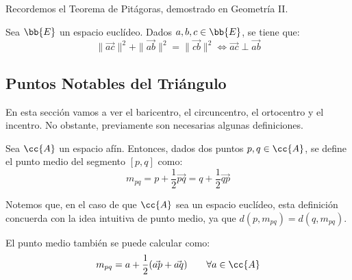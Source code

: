 Recordemos el Teorema de Pitágoras, demostrado en Geometría II.
\begin{teo}[de Pitágoras]
    Sea $\bb{E}$ un espacio euclídeo. Dados $a,b,c\in \bb{E}$, se tiene que:
    \begin{equation*}
        \|\vec{ac}\|^2 + \|\vec{ab}\|^2 = \|\vec{cb}\|^2 \Longleftrightarrow \vec{ac}\perp \vec{ab}
    \end{equation*}
    \begin{figure}[H]
        \centering
    \end{figure}
\end{teo}


\subsection{Puntos Notables del Triángulo}

En esta sección vamos a ver el baricentro, el circuncentro, el ortocentro y el incentro. No obstante, previamente son necesarias algunas definiciones.

\begin{definicion} Sea $\cc{A}$ un espacio afín. Entonces, dados dos puntos $p,q\in \cc{A}$, se define el punto medio del segmento $[p,q]$ como:
\begin{equation*}
    m_{pq} = p+\frac{1}{2}\vec{pq} = q + \frac{1}{2}\vec{qp}
\end{equation*}
\end{definicion}
Notemos que, en el caso de que $\cc{A}$ sea un espacio euclídeo, esta definición concuerda con la idea intuitiva de punto medio, ya que $d(p,m_{pq})=d(q,m_{pq})$.

El punto medio también se puede calcular como:
\begin{equation*}
    m_{pq} = a + \frac{1}{2}(\vec{ap} + \vec{aq}) \qquad \forall a\in \cc{A}
\end{equation*}

